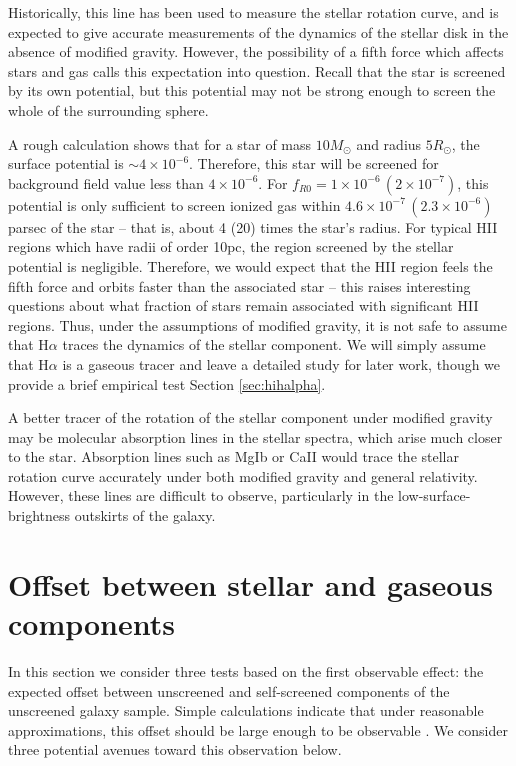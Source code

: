 \documentclass[useAMS,usenatbib,twocolumn]{mn2e}
\newcommand{\ha}{H$\alpha$}
\begin{document}
Historically, this line has been
used to measure the stellar rotation curve, and is expected to give accurate
measurements of the dynamics of the stellar disk in the absence of modified
gravity. However, the possibility of a fifth force which
affects stars and gas calls this expectation into question.
Recall that the star is screened by its own potential, but this potential
may not be strong enough to screen the whole of the surrounding sphere.

A rough calculation shows that for a star of mass $10 M_\odot$ and radius
$5 R_\odot$, the surface potential is $\sim 4\times10^{-6}$. Therefore, this
star will be screened for background field value less than $4\times10^{-6}$.
For $f_{R0} = 1\times10^{-6}\,(2\times10^{-7})$, this potential is only
sufficient to screen ionized gas within
$4.6\times10^{-7}\,(2.3\times10^{-6})$ parsec of the star -- that is, about
4 (20) times the star's radius.
For typical HII regions which have radii of order 10pc, the region screened
by the stellar potential is negligible.  Therefore, we would expect  that the
HII region feels the fifth force and 
orbits faster than the associated star --
this raises interesting questions about what fraction of stars remain
associated with significant HII regions. Thus, under the assumptions of
modified gravity,  it is not safe to assume that \ha{}
traces the dynamics of the stellar component.
We will simply assume that \ha{} is a gaseous tracer and leave 
a detailed study for later work, though we provide a brief empirical
test Section \ref{sec:hihalpha}.

A better tracer of the rotation of the stellar component under modified gravity
may be molecular absorption lines in the stellar spectra, which arise much
closer to the star. Absorption lines such as MgIb or CaII would trace the
stellar rotation curve accurately under both modified gravity and general
relativity. However, these lines are difficult to observe, particularly
in the low-surface-brightness outskirts of the galaxy. 



\section{Offset between stellar and gaseous components}
\label{sec:offset}

In this section we consider three tests based on the first observable effect:
the expected offset between unscreened and self-screened components of the
unscreened galaxy sample. Simple calculations indicate that under
reasonable approximations, this offset should be large enough to be
observable \citep{bhuvjake2011}.  We consider three potential avenues toward
this observation below.
\end{document}
